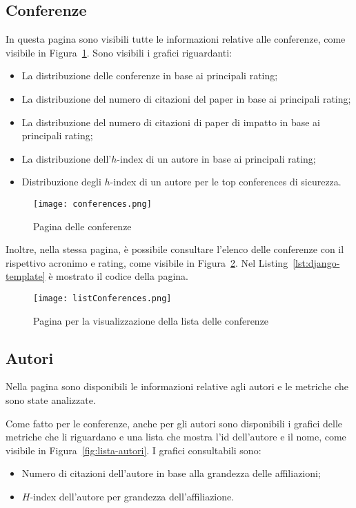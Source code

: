 \subsection{Conferenze}
In questa pagina sono visibili tutte le informazioni relative alle conferenze, come visibile in Figura~\ref{fig:conferences}.
Sono visibili i grafici riguardanti:
\begin{itemize}
  \item La distribuzione delle conferenze in base ai principali rating;
  \item La distribuzione del numero di citazioni del paper in base ai principali rating;
  \item La distribuzione del numero di citazioni di paper di impatto in base ai principali rating;
  \item La distribuzione dell'$h$-index di un autore in base ai principali rating;
  \item Distribuzione degli $h$-index di un autore per le top conferences di sicurezza.
\end{itemize}

\begin{figure}
  \centering
  \texttt{[image: conferences.png]}
  \caption{Pagina delle conferenze}
  \label{fig:conferences}
\end{figure}


Inoltre, nella stessa pagina, è possibile consultare l'elenco delle conferenze con il rispettivo acronimo e rating, come visibile in Figura~\ref{fig:list-conferences}. Nel Listing~\ref{lst:django-template} è mostrato il codice della pagina.


\begin{figure}
  \centering
  \texttt{[image: listConferences.png]}
  \caption{Pagina per la visualizzazione della lista delle conferenze}
  \label{fig:list-conferences}
\end{figure}

\subsection{Autori}
Nella pagina sono disponibili le informazioni relative agli autori e le metriche che sono state analizzate.

Come fatto per le conferenze, anche per gli autori sono disponibili i grafici delle metriche che li riguardano e una lista che mostra l'id dell'autore e il nome, come visibile in Figura~\ref{fig:lista-autori}. I grafici consultabili sono:
\begin{itemize}
  \item Numero di citazioni dell'autore in base alla grandezza delle affiliazioni;
  \item $H$-index dell'autore per grandezza dell'affiliazione.
\end{itemize}

